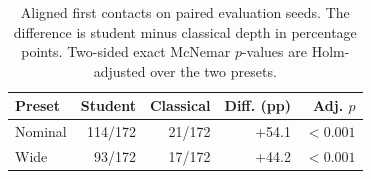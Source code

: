 \begin{table}[t]
\centering
\caption{Aligned first contacts on paired evaluation seeds. The difference is
student minus classical depth in percentage points. Two-sided exact McNemar
$p$-values are Holm-adjusted over the two presets.}
\label{tab:perception-paired}
\footnotesize
\setlength{\tabcolsep}{3pt}
\begin{tabular}{lrrrr}
\hline
Preset & Student & Classical & Diff. (pp) & Adj. $p$ \\
\hline
Nominal & 114/172 & 21/172 & +54.1 & $<0.001$ \\
Wide & 93/172 & 17/172 & +44.2 & $<0.001$ \\
\hline
\end{tabular}
\end{table}
